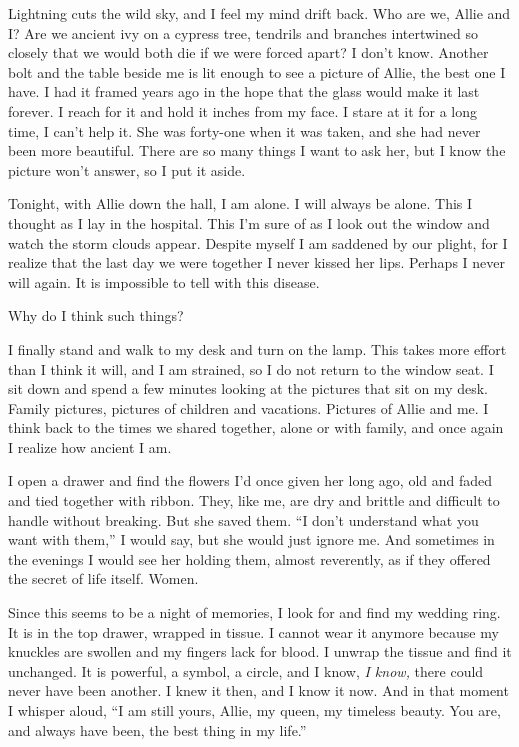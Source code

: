\documentclass[10pt, twoside, openright]{book}
\begin{document}
Lightning cuts the wild sky, and I feel my mind drift back. Who are we,
Allie and I? Are we ancient ivy on a cypress tree, tendrils and branches
intertwined so closely that we would both die if we were forced apart? I
don't know. Another bolt and the table beside me is lit enough to see a
picture of Allie, the best one I have. I had it framed years ago in the
hope that the glass would make it last forever. I reach for it and hold
it inches from my face. I stare at it for a long time, I can't help it.
She was forty-one when it was taken, and she had never been more
beautiful. There are so many things I want to ask her, but I know the
picture won't answer, so I put it aside.

Tonight, with Allie down the hall, I am alone. I will always be alone.
This I thought as I lay in the hospital. This I'm sure of as I look out
the window and watch the storm clouds appear. Despite myself I am
saddened by our plight, for I realize that the last day we were together
I never kissed her lips. Perhaps I never will again. It is impossible to
tell with this disease.

Why do I think such things?

I finally stand and walk to my desk and turn on the lamp. This takes
more effort than I think it will, and I am strained, so I do not return
to the window seat. I sit down and spend a few minutes looking at the
pictures that sit on my desk. Family pictures, pictures of children and
vacations. Pictures of Allie and me. I think back to the times we shared
together, alone or with family, and once again I realize how ancient I
am.

I open a drawer and find the flowers I'd once given her long ago, old
and faded and tied together with ribbon. They, like me, are dry and
brittle and difficult to handle without breaking. But she saved them.
``I don't understand what you want with them,'' I would say, but she
would just ignore me. And sometimes in the evenings I would see her
holding them, almost reverently, as if they offered the secret of life
itself. Women.

Since this seems to be a night of memories, I look for and find my
wedding ring. It is in the top drawer, wrapped in tissue. I cannot wear
it anymore because my knuckles are swollen and my fingers lack for
blood. I unwrap the tissue and find it unchanged. It is powerful, a
symbol, a circle, and I know, \emph{I know,} there could never have been
another. I knew it then, and I know it now. And in that moment I whisper
aloud, ``I am still yours, Allie, my queen, my timeless beauty. You are,
and always have been, the best thing in my life.''
\end{document}
